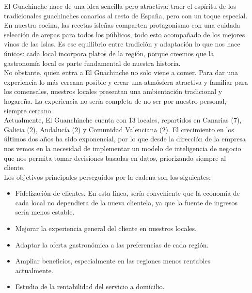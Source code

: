 \documentclass[11pt]{opticajnl}
\begin{document}
El Guachinche nace de una idea sencilla pero atractiva: traer el espíritu de los tradicionales guachinches canarios al resto de España, pero con un toque especial. En nuestra cocina, las recetas isleñas comparten protagonismo con una cuidada selección de arepas para todos los públicos, todo esto acompañado de los mejores vinos de las Islas. Es ese equilibrio entre tradición y adaptación lo que nos hace únicos: cada local incorpora platos de la región, porque creemos que la gastronomía local es parte fundamental de nuestra historia. \\

No obstante, quien entra a El Guachinche no solo viene a comer. Para dar una experiencia lo más cercana posible y crear una atmósfera atractiva y familiar para los comensales, nuestros locales presentan una ambientación tradicional y hogareña. La experiencia no sería completa de no ser por nuestro personal, siempre cercano. \\

Actualmente, El Guanchinche cuenta con 13 locales, repartidos en Canarias (7), Galicia (2), Andalucía (2) y Comunidad Valenciana (2). El crecimiento en los últimos dos años ha sido exponencial, por lo que desde la dirección de la empresa nos vemos en la necesidad de implementar un modelo de inteligencia de negocio que nos permita tomar decisiones basadas en datos, priorizando siempre al cliente. \\

\noindent Los objetivos principales perseguidos por la cadena son los siguientes: 
\begin{itemize}
\item Fidelización de clientes. En esta línea, sería conveniente que la economía de cada local no dependiera de la nueva clientela, ya que la fuente de ingresos sería menos estable. 
\item Mejorar la experiencia general del cliente en nuestros locales. 
\item Adaptar la oferta gastronómica a las preferencias de cada región.
\item Ampliar beneficios, especialmente en las regiones menos rentables actualmente.
\item Estudio de la rentabilidad del servicio a domicilio.
\end{itemize}
\end{document}
